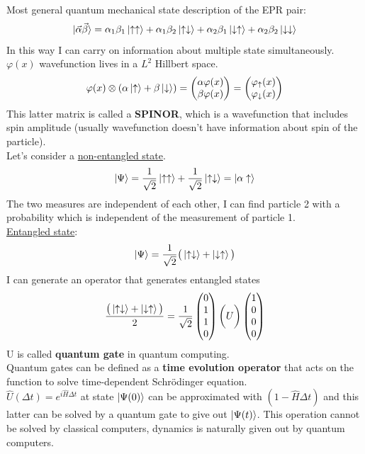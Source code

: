 Most general quantum mechanical state description of the EPR pair:
\[
\ket{\vec{\alpha}\vec{\beta}}=\alpha_1\beta_1\ket{\uparrow\uparrow}+\alpha_1\beta_2\ket{\uparrow\downarrow}+\alpha_2\beta_1\ket{\downarrow\uparrow}+\alpha_2\beta_2\ket{\downarrow\downarrow}
\]
In this way I can carry on information about multiple state simultaneously.\\
\newline
$\varphi(x)$ wavefunction lives in a \emph{$L^2$} Hillbert space.\\
\[
\varphi(x)\otimes(\alpha\ket{\uparrow}+\beta\ket{\downarrow})=\begin{pmatrix}\alpha\varphi(x)\\\beta\varphi(x)\end{pmatrix}=\begin{pmatrix}\varphi_{\uparrow}(x)\\\varphi_{\downarrow}(x)\end{pmatrix}
\]
This latter matrix is called a \textbf{SPINOR}, which is a wavefunction that includes spin amplitude (usually wavefunction doesn't have information about spin of the particle).\\
Let's consider a \ul{non-entangled state}.
\[
\ket{\Psi}=\frac{1}{\sqrt{2}}\ket{\uparrow\uparrow}+\frac{1}{\sqrt{2}}\ket{\uparrow\downarrow}=\ket{\alpha\uparrow}
\]
The two measures are independent of each other, I can find particle 2 with a probability which is independent of the measurement of particle 1.\\
\ul{Entangled state}:
\[
\ket{\Psi}=\frac{1}{\sqrt{2}}\big(\ket{\uparrow\downarrow}+\ket{\downarrow\uparrow}\big)
\]
I can generate an operator that generates entangled states
\[
\frac{\big(\ket{\uparrow\downarrow}+\ket{\downarrow\uparrow}\big)}{2}=\frac{1}{\sqrt{2}}\begin{pmatrix}0\\1\\1\\0\end{pmatrix}\bigg(U\bigg)\begin{pmatrix}1\\0\\0\\0\end{pmatrix}
\]
U is called \textbf{quantum gate} in quantum computing.\\
Quantum gates can be defined as a \textbf{time evolution operator} that acts on the function to solve time-dependent Schr\"odinger equation.\\
$\hat{U}(\Delta t) = e^{i\hat{H}\Delta t}$ at state $\ket{\Psi(0)}$ can be approximated with $(1-\hat{H}\Delta t)$ and this latter can be solved by a quantum gate to give out $\ket{\Psi(t)}$. This operation cannot be solved by classical computers, dynamics is naturally given out by quantum computers.\\
